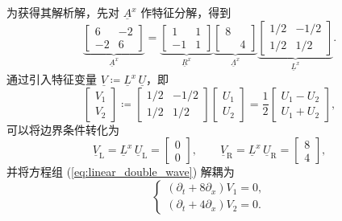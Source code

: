 为获得其解析解，先对 $\underline{A}^{x}$ 作特征分解，得到
\begin{equation}
\underbrace{\begin{bmatrix}6 & -2\\
-2 & 6
\end{bmatrix}}_{\underline{A}^{x}}=\underbrace{\begin{bmatrix}1 & 1\\
-1 & 1
\end{bmatrix}}_{\underline{R}^{x}}\underbrace{\begin{bmatrix}8\\
 & 4
\end{bmatrix}}_{\underline{\varLambda}^{x}}\underbrace{\begin{bmatrix}1/2 & -1/2\\
1/2 & 1/2
\end{bmatrix}}_{\underline{L}^{x}}.
\end{equation}
通过引入特征变量 $\underline{V}\coloneqq\underline{L}^{x}\,\underline{U}$，即
\begin{equation}
\begin{bmatrix}V_{1}\\
V_{2}
\end{bmatrix}\coloneqq\begin{bmatrix}1/2 & -1/2\\
1/2 & 1/2
\end{bmatrix}\begin{bmatrix}U_{1}\\
U_{2}
\end{bmatrix}=\frac{1}{2}\begin{bmatrix}U_{1}-U_{2}\\
U_{1}+U_{2}
\end{bmatrix},
\end{equation}
可以将边界条件转化为
\begin{equation}
\underline{V}_{\mathrm{L}}=\underline{L}^{x}\,\underline{U}_{\mathrm{L}}=\begin{bmatrix}0\\
0
\end{bmatrix},\qquad\underline{V}_{\mathrm{R}}=\underline{L}^{x}\,\underline{U}_{\mathrm{R}}=\begin{bmatrix}8\\
4
\end{bmatrix},
\end{equation}
并将方程组 (\ref{eq:linear_double_wave}) 解耦为
\begin{equation}
\begin{cases}
\left(\partial_{t}+8\partial_{x}\right)V_{1}=0,\\
\left(\partial_{t}+4\partial_{x}\right)V_{2}=0.
\end{cases}
\end{equation}

